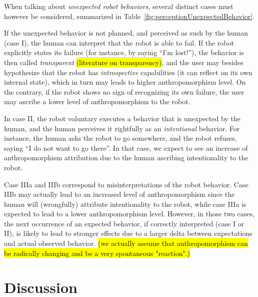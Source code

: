 \documentclass{frontiersSCNS} %
\begin{document}
When talking about \emph{unexpected robot behaviors}, several distinct cases
must however be considered, summarized in
Table~\ref{fig:perceptionUnexpectedBehavior}.

If the unexpected behavior is not planned, and perceived as such by the human
(case I), the human can interpret that the robot is able to fail. If the robot
explicitly states its failure (for instance, by saying ``I'm lost!''), the
behavior is then called \emph{transparent} 
\hl{(literature on transparency)}, and the user may besides hypothesize that the
robot has \emph{introspective} capabilities (it can reflect on its own internal
state), which in turn may leads to higher anthropomorphism level.  On the
contrary, if the robot shows no sign of recognizing its own failure, the user
may ascribe a lower level of anthropomorphism to the robot.

In case II, the robot voluntary executes a behavior that is unexpected by the
human, and the human perceives it rightfully as an \emph{intentional} behavior.
For instance, the human asks the robot to go somewhere, and the robot refuses,
saying ``I do not want to go there''. In that case, we expect to see an increase
of anthropomorphism attribution due to the human ascribing intentionality to the
robot.

Case IIIa and IIIb correspond to misinterpretations of the robot behavior. Case
IIIb may actually lead to an increased level of anthropomorphism since the human
will (wrongfully) attribute intentionality to the robot, while case IIIa is
expected to lead to a lower anthropomorphism level.  However, in those two
cases, the next occurrence of an expected behavior, if correctly interpreted
(case I or II), is likely to lead to stronger effects due to a larger delta
between expectations and actual observed behavior. \hl{(we actually assume that
anthropomorphism can be radically changing and be a very spontaneous
"reaction".)}



%
%
%
%
%
%


\section{Discussion}
\label{sec:discussion}
\end{document}
